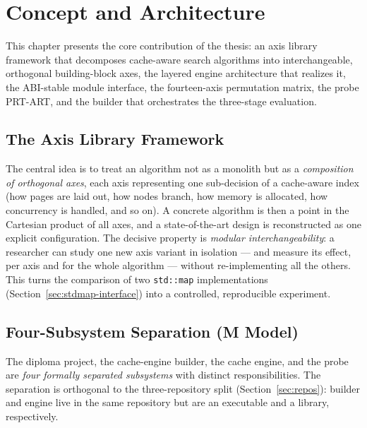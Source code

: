 \chapter{Concept and Architecture}\label{ch:concept}

This chapter presents the core contribution of the thesis: an axis library framework that
decomposes cache-aware search algorithms into interchangeable, orthogonal building-block
axes, the layered engine architecture that realizes it, the ABI-stable module interface,
the fourteen-axis permutation matrix, the probe PRT-ART, and the builder that orchestrates
the three-stage evaluation.

\section{The Axis Library Framework}\label{sec:axis-framework}

The central idea is to treat an algorithm not as a monolith but as a \emph{composition of
orthogonal axes}, each axis representing one sub-decision of a cache-aware index (how pages
are laid out, how nodes branch, how memory is allocated, how concurrency is handled, and so
on). A concrete algorithm is then a point in the Cartesian product of all axes, and a
state-of-the-art design is reconstructed as one explicit configuration. The decisive
property is \emph{modular interchangeability}: a researcher can study one new axis variant
in isolation --- and measure its effect, per axis and for the whole algorithm --- without
re-implementing all the others. This turns the comparison of two \texttt{std::map}
implementations (Section~\ref{sec:stdmap-interface}) into a controlled, reproducible
experiment.

\section{Four-Subsystem Separation (M Model)}\label{sec:m-model}

The diploma project, the cache-engine builder, the cache engine, and the probe are
\emph{four formally separated subsystems} with distinct responsibilities. The separation
is orthogonal to the three-repository split (Section~\ref{sec:repos}): builder and engine
live in the same repository but are an executable and a library, respectively.


